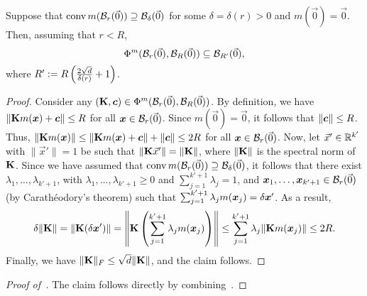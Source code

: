 \begin{lemma}
    \label{lemma:fulldim}
    Suppose that $\operatorname{conv} m({\mathcal{B}}_r(\vec{0})) \supseteq {\mathcal{B}}_\delta(\vec{0})$ for some $\delta = \delta(r) > 0$ and $m(\vec{0}) = \vec{0}$. Then, assuming that $r < R$,
    \begin{equation}
        \Phi^m( {\mathcal{B}}_r(\vec{0}), {\mathcal{B}}_R(\vec{0})) \subseteq {\mathcal{B}}_{ R'}(\vec{0}),
    \end{equation}
    where $R' := R \left( \frac{2\sqrt{d}}{\delta(r)} + 1 \right)$.
\end{lemma}

\begin{proof}
    Consider any $({\mathbf{K}}, \bm{c}) \in \Phi^m( {\mathcal{B}}_r(\vec{0}), {\mathcal{B}}_R(\vec{0}))$. By definition, we have $\| {\mathbf{K}} m({\bm{x}}) + \bm{c} \| \leq R$ for all ${\bm{x}} \in {\mathcal{B}}_r(\vec{0})$. Since $m(\vec{0}) = \vec{0}$, it follows that $\|\bm{c} \| \leq R$. Thus, $\| {\mathbf{K}} m({\bm{x}}) \| \leq \|{\mathbf{K}} m({\bm{x}}) + \bm{c} \| + \|\bm{c} \| \leq 2 R$ for all ${\bm{x}} \in {\mathcal{B}}_r(\vec{0})$. Now, let $\vec{x}' \in \mathbb R^{k'}$ with $\|\vec{x}' \| = 1$ be such that $\| {\mathbf{K}} \vec{x}' \| = \| {\mathbf{K}}\|$, where $\| {\mathbf{K}} \|$ is the spectral norm of ${\mathbf{K}}$. Since we have assumed that $\operatorname{conv} m({\mathcal{B}}_r(\vec{0})) \supseteq {\mathcal{B}}_\delta(\vec{0})$, it follows that there exist $\lambda_1, \dots, \lambda_{k'+1}$, with $\lambda_1, \dots, \lambda_{k' + 1} \geq 0$ and $\sum_{j=1}^{k'+1} \lambda_j = 1$, and ${\bm{x}}_1, \dots, {\bm{x}}_{k'+1} \in {\mathcal{B}}_r(\vec{0})$ (by Carath\'eodory's theorem) such that $\sum_{j=1}^{k'+1} \lambda_j m({\bm{x}}_j) = \delta {\bm{x}}'$. As a result,
    \begin{equation}
        \delta \|{\mathbf{K}}\| = \| {\mathbf{K}} (\delta {\bm{x}}') \| = \left\| {\mathbf{K}} \left( \sum_{j=1}^{k'+1} \lambda_j m({\bm{x}}_j) \right) \right\| \leq \sum_{j=1}^{k' + 1} \lambda_j \|{\mathbf{K}} m({\bm{x}}_j) \| \leq 2R.
    \end{equation}
    Finally, we have $\|{\mathbf{K}}\|_F \leq \sqrt{d} \|{\mathbf{K}}\|$, and the claim follows.
\end{proof}

\begin{proof}[Proof of~]
    The claim follows directly by combining~.
\end{proof}
